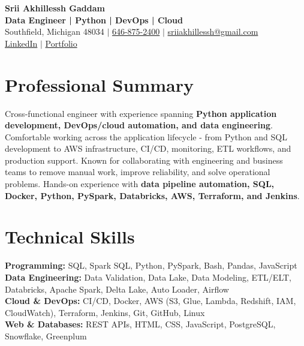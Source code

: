 \documentclass[letterpaper,10pt]{article}
\begin{document}
\fontsize{9.35pt}{10.45pt}\selectfont

\begin{center}
    {\LARGE \textbf{Srii Akhillessh Gaddam}} \\[-1pt]
    \textbf{Data Engineer | Python | DevOps | Cloud} \\[2pt]
    Southfield, Michigan 48034 $|$
    \href{tel:6468752400}{646-875-2400} $|$
    \href{mailto:sriiakhillessh@gmail.com}{sriiakhillessh@gmail.com} \\[1pt]
    \href{https://www.linkedin.com/in/srii-akhiilessh-gaddam-b48668191/}{LinkedIn} $|$
    \href{https://sriiakhillesshg.github.io/portfolio/}{Portfolio}
\end{center}
\vspace{-8pt}

\section{Professional Summary}
\small{Cross-functional engineer with experience spanning \textbf{Python application development, DevOps/cloud automation, and data engineering}. Comfortable working across the application lifecycle - from Python and SQL development to AWS infrastructure, CI/CD, monitoring, ETL workflows, and production support. Known for collaborating with engineering and business teams to remove manual work, improve reliability, and solve operational problems. Hands-on experience with \textbf{data pipeline automation, SQL, Docker, Python, PySpark, Databricks, AWS, Terraform, and Jenkins}.}

\section{Technical Skills}
\small{
\textbf{Programming:} SQL, Spark SQL, Python, PySpark, Bash, Pandas, JavaScript \\
\textbf{Data Engineering:} Data Validation, Data Lake, Data Modeling, ETL/ELT, Databricks, Apache Spark, Delta Lake, Auto Loader, Airflow \\
\textbf{Cloud \& DevOps:} CI/CD, Docker, AWS (S3, Glue, Lambda, Redshift, IAM, CloudWatch), Terraform, Jenkins, Git, GitHub, Linux \\
\textbf{Web \& Databases:} REST APIs, HTML, CSS, JavaScript, PostgreSQL, Snowflake, Greenplum
}
\end{document}

